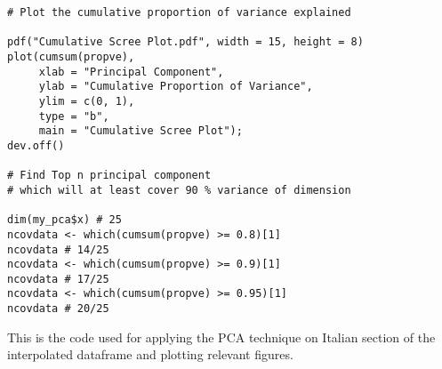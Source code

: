 \begin{verbatim}
# Plot the cumulative proportion of variance explained

pdf("Cumulative Scree Plot.pdf", width = 15, height = 8) 
plot(cumsum(propve),
     xlab = "Principal Component",
     ylab = "Cumulative Proportion of Variance",
     ylim = c(0, 1), 
     type = "b",
     main = "Cumulative Scree Plot");
dev.off()

# Find Top n principal component
# which will at least cover 90 % variance of dimension

dim(my_pca$x) # 25
ncovdata <- which(cumsum(propve) >= 0.8)[1] 
ncovdata # 14/25
ncovdata <- which(cumsum(propve) >= 0.9)[1] 
ncovdata # 17/25
ncovdata <- which(cumsum(propve) >= 0.95)[1] 
ncovdata # 20/25
\end{verbatim}

This is the code used for applying the PCA technique on Italian section of the interpolated dataframe and plotting relevant figures.
